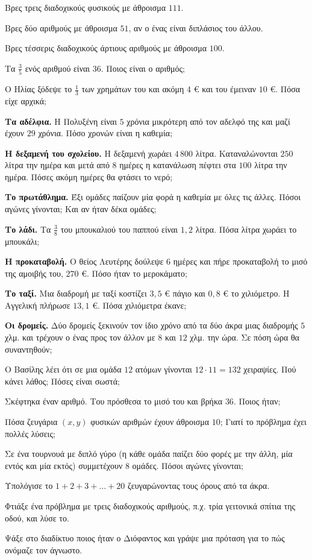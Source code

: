 

\ex Βρες τρεις διαδοχικούς φυσικούς με άθροισμα $111$.

\ex Βρες δύο αριθμούς με άθροισμα $51$, αν ο ένας είναι διπλάσιος του άλλου.

\ex Βρες τέσσερις διαδοχικούς άρτιους αριθμούς με άθροισμα $100$.

\ex Τα $\frac{3}{5}$ ενός αριθμού είναι $36$. Ποιος είναι ο αριθμός;

\ex Ο Ηλίας ξόδεψε το $\frac{1}{3}$ των χρημάτων του και ακόμη $4$ € και του έμειναν $10$ €. Πόσα είχε αρχικά;


\ex \textbf{Τα αδέλφια.} Η Πολυξένη είναι $5$ χρόνια μικρότερη από τον αδελφό της και μαζί έχουν $29$ χρόνια. Πόσο χρονών είναι η καθεμία;

\ex \textbf{Η δεξαμενή του σχολείου.} Η δεξαμενή χωράει $4\,800$ λίτρα. Καταναλώνονται $250$ λίτρα την ημέρα και μετά από $8$ ημέρες η κατανάλωση πέφτει στα $100$ λίτρα την ημέρα. Πόσες ακόμη ημέρες θα φτάσει το νερό;

\ex \textbf{Το πρωτάθλημα.} Έξι ομάδες παίζουν μία φορά η καθεμία με όλες τις άλλες. Πόσοι αγώνες γίνονται; Και αν ήταν δέκα ομάδες;

\ex \textbf{Το λάδι.} Τα $\frac{3}{8}$ του μπουκαλιού του παππού είναι $1{,}2$ λίτρα. Πόσα λίτρα χωράει το μπουκάλι;

\ex \textbf{Η προκαταβολή.} Ο θείος Λευτέρης δούλεψε $6$ ημέρες και πήρε προκαταβολή το μισό της αμοιβής του, $270$ €. Πόσο ήταν το μεροκάματο;

\ex \textbf{Το ταξί.} Μια διαδρομή με ταξί κοστίζει $3{,}5$ € πάγιο και $0{,}8$ € το χιλιόμετρο. Η Αγγελική πλήρωσε $13{,}1$ €. Πόσα χιλιόμετρα έκανε;

\ex \textbf{Οι δρομείς.} Δύο δρομείς ξεκινούν τον ίδιο χρόνο από τα δύο άκρα μιας διαδρομής $5$ χλμ. και τρέχουν ο ένας προς τον άλλον με $8$ και $12$ χλμ. την ώρα. Σε πόση ώρα θα συναντηθούν;


\ex Ο Βασίλης λέει ότι σε μια ομάδα $12$ ατόμων γίνονται $12\cdot11=132$ χειραψίες. Πού κάνει λάθος; Πόσες είναι σωστά;

\ex Σκέφτηκα έναν αριθμό. Του πρόσθεσα το μισό του και βρήκα $36$. Ποιος ήταν;

\ex Πόσα ζευγάρια $(x,y)$ φυσικών αριθμών έχουν άθροισμα $10$; Γιατί το πρόβλημα έχει πολλές λύσεις;

\ex Σε ένα τουρνουά με διπλό γύρο (η κάθε ομάδα παίζει δύο φορές με την άλλη, μία εντός και μία εκτός) συμμετέχουν $8$ ομάδες. Πόσοι αγώνες γίνονται;

\ex Υπολόγισε το $1+2+3+\dots+20$ ζευγαρώνοντας τους όρους από τα άκρα.


\ex Φτιάξε ένα πρόβλημα με τρεις διαδοχικούς αριθμούς, π.χ. τρία γειτονικά σπίτια της οδού, και λύσε το.

\ex Ψάξε στο διαδίκτυο ποιος ήταν ο Διόφαντος και γράψε μια πρόταση για το πώς ονόμαζε τον άγνωστο.
